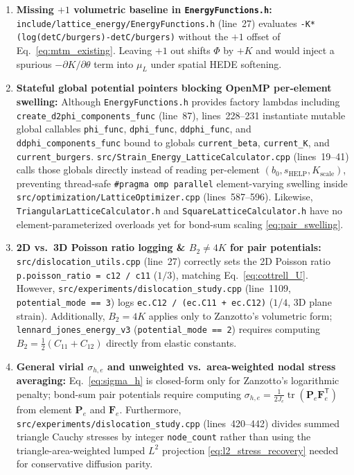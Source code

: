 \documentclass[11pt,a4paper]{article}
\newcommand{\T}{^{\mathsf T}}
\newcommand{\tr}{\operatorname{tr}}
\newcommand{\code}[1]{\texttt{#1}}
\begin{document}
\begin{enumerate}[nosep]
  \item \textbf{Missing $+1$ volumetric baseline in \code{EnergyFunctions.h}:} \code{include/\allowbreak lattice\_\allowbreak energy/\allowbreak EnergyFunctions.h} (line~27) evaluates \code{-K*(log(detC/burgers)\allowbreak -detC/burgers)} without the $+1$ offset of Eq.~\eqref{eq:mtm_existing}. Leaving $+1$ out shifts $\Phi$ by $+K$ and would inject a spurious $-\partial K/\partial\theta$ term into $\mu_L$ under spatial HEDE softening.
  \item \textbf{Stateful global potential pointers blocking OpenMP per-element swelling:} Although \code{EnergyFunctions.h} provides factory lambdas including \code{create\_\allowbreak d2phi\_\allowbreak components\_\allowbreak func} (line~87), lines~228--231 instantiate mutable global callables \code{phi\_func}, \code{dphi\_func}, \code{ddphi\_func}, and \code{ddphi\_\allowbreak components\_\allowbreak func} bound to globals \code{current\_beta}, \code{current\_K}, and \code{current\_burgers}. \code{src/\allowbreak Strain\_\allowbreak Energy\_\allowbreak LatticeCalculator.cpp} (lines~19--41) calls those globals directly instead of reading per-element $(b_0, s_{\text{HELP}}, K_{\text{scale}})$, preventing thread-safe \code{\#pragma omp parallel} element-varying swelling inside \code{src/\allowbreak optimization/\allowbreak LatticeOptimizer.cpp} (lines~587--596). Likewise, \code{Triangular\allowbreak LatticeCalculator.h} and \code{Square\allowbreak LatticeCalculator.h} have no element-parameterized overloads yet for bond-sum scaling \eqref{eq:pair_swelling}.
  \item \textbf{2D vs.\ 3D Poisson ratio logging \& $B_2 \neq 4K$ for pair potentials:} \code{src/\allowbreak dislocation\_\allowbreak utils.cpp} (line~27) correctly sets the 2D Poisson ratio \code{p.poisson\_ratio = c12 / c11} ($1/3$), matching Eq.~\eqref{eq:cottrell_U}. However, \code{src/\allowbreak experiments/\allowbreak dislocation\_\allowbreak study.cpp} (line~1109, \code{potential\_mode == 3}) logs \code{ec.C12 / (ec.C11 + ec.C12)} ($1/4$, 3D plane strain). Additionally, $B_2 = 4K$ applies only to Zanzotto's volumetric form; \code{lennard\_\allowbreak jones\_\allowbreak energy\_\allowbreak v3} (\code{potential\_mode == 2}) requires computing $B_2 = \frac{1}{2}(C_{11}+C_{12})$ directly from elastic constants.
  \item \textbf{General virial $\sigma_{h,e}$ and unweighted vs.\ area-weighted nodal stress averaging:} Eq.~\eqref{eq:sigma_h} is closed-form only for Zanzotto's logarithmic penalty; bond-sum pair potentials require computing $\sigma_{h,e} = \frac{1}{2J_e}\tr(\mathbf{P}_e\mathbf{F}_e\T)$ from element $\mathbf{P}_e$ and $\mathbf{F}_e$. Furthermore, \code{src/\allowbreak experiments/\allowbreak dislocation\_\allowbreak study.cpp} (lines~420--442) divides summed triangle Cauchy stresses by integer \code{node\_count} rather than using the triangle-area-weighted lumped $L^2$ projection \eqref{eq:l2_stress_recovery} needed for conservative diffusion parity.

\end{enumerate}
\end{document}

